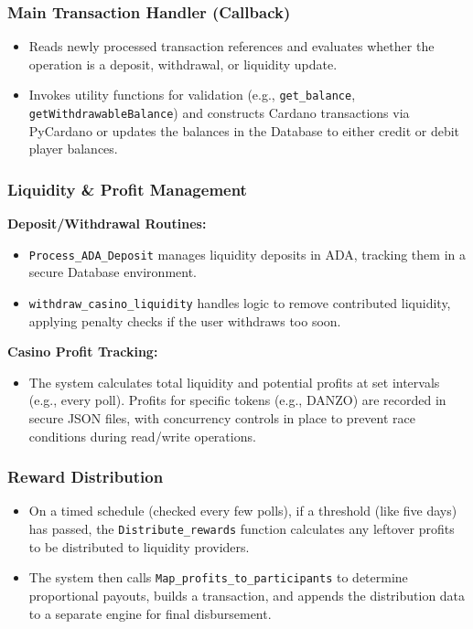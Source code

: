 \documentclass[11pt,a4paper]{article}
\begin{document}
\subsubsection{Main Transaction Handler (Callback)}
\begin{itemize}
    \item Reads newly processed transaction references and evaluates whether the operation is a deposit, withdrawal, or liquidity update.
    \item Invokes utility functions for validation (e.g., \texttt{get\_balance}, \texttt{getWithdrawableBalance}) and constructs Cardano transactions via PyCardano or updates the balances in the Database to either credit or debit player balances.
\end{itemize}

\subsubsection{Liquidity \& Profit Management}
\textbf{Deposit/Withdrawal Routines:}
\begin{itemize}
    \item \texttt{Process\_ADA\_Deposit} manages liquidity deposits in ADA, tracking them in a secure Database environment.
    \item \texttt{withdraw\_casino\_liquidity} handles logic to remove contributed liquidity, applying penalty checks if the user withdraws too soon.
\end{itemize}

\textbf{Casino Profit Tracking:}
\begin{itemize}
    \item The system calculates total liquidity and potential profits at set intervals (e.g., every poll). Profits for specific tokens (e.g., DANZO) are recorded in secure JSON files, with concurrency controls in place to prevent race conditions during read/write operations.
\end{itemize}

\subsubsection{Reward Distribution}
\begin{itemize}
    \item On a timed schedule (checked every few polls), if a threshold (like five days) has passed, the \texttt{Distribute\_rewards} function calculates any leftover profits to be distributed to liquidity providers.
    \item The system then calls \texttt{Map\_profits\_to\_participants} to determine proportional payouts, builds a transaction, and appends the distribution data to a separate engine for final disbursement.
\end{itemize}
\end{document}
